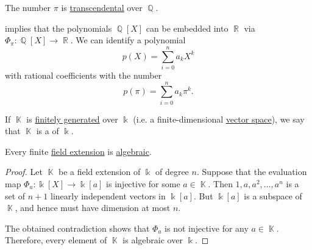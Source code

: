 \begin{theorem}[Pi is transcendental]\label{thm:pi_is_transcendental}
  The number \hyperref[def:pi]{\( \pi \)} is \hyperref[def:transcendetal_element]{transcendental} over \( \BbbQ \).
\end{theorem}

\begin{example}\label{ex:polynomials_over_pi}
   implies that the polynomials \( \BbbQ[X] \) can be embedded into \( \BbbR \) via \( \Phi_\pi: \BbbQ[X] \to \BbbR \). We can identify a polynomial
  \begin{equation*}
    p(X) = \sum_{i=0}^n a_k X^k
  \end{equation*}
  with rational coefficients with the number
  \begin{equation*}
    p(\pi) = \sum_{i=0}^n a_k \pi^k.
  \end{equation*}
\end{example}

\begin{definition}\label{def:finite_field_extension}
  If \( \BbbK \) is \hyperref[def:module_presentation]{finitely generated} over \( \Bbbk \) (i.e. a finite-dimensional \hyperref[def:vector_space]{vector space}), we say that \( \BbbK \) is a  of \( \Bbbk \).
\end{definition}

\begin{lemma}\label{thm:prime_field_extensions_are_algebraic}
  Every finite \hyperref[def:field_extension]{field extension} is \hyperref[def:transcendetal_element]{algebraic}.
\end{lemma}
\begin{proof}
  Let \( \BbbK \) be a field extension of \( \Bbbk \) of degree \( n \). Suppose that the evaluation map \( \Phi_a: \Bbbk[X] \to \Bbbk[a] \) is injective for some \( a \in \BbbK \). Then \( 1, a, a^2, \ldots, a^n \) is a set of \( n + 1 \) linearly independent vectors in \( \Bbbk[a] \). But \( \Bbbk[a] \) is a subspace of \( \BbbK \), and hence must have dimension at most \( n \).

  The obtained contradiction shows that \( \Phi_a \) is not injective for any \( a \in \BbbK \). Therefore, every element of \( \BbbK \) is algebraic over \( \Bbbk \).
\end{proof}

